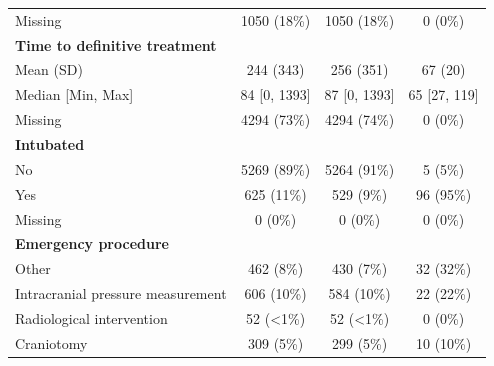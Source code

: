 \documentclass[12pt, a4paper]{article}
\begin{document}
\begin{appendices}
\begin{table}[t!]
{\begin{tabular}{lccc}
                \hspace{3mm}Missing                           & 1050 (18\%)       & 1050 (18\%)       & 0 (0\%)       \\
                \textbf{Time to definitive treatment}         &                   &                   &               \\
                \hspace{3mm}Mean (SD)                         & 244 (343)         & 256 (351)         & 67 (20)       \\
                \hspace{3mm}Median [Min, Max]                 & 84 [0, 1393]      & 87 [0, 1393]      & 65 [27, 119]  \\
                \hspace{3mm}Missing                           & 4294 (73\%)       & 4294 (74\%)       & 0 (0\%)       \\
                \textbf{Intubated}                            &                   &                   &               \\
                \hspace{3mm}No                                & 5269 (89\%)       & 5264 (91\%)       & 5 (5\%)       \\
                \hspace{3mm}Yes                               & 625 (11\%)        & 529 (9\%)         & 96 (95\%)     \\
                \hspace{3mm}Missing                           & 0 (0\%)           & 0 (0\%)           & 0 (0\%)       \\
                \textbf{Emergency procedure}                  &                   &                   &               \\
                \hspace{3mm}Other                             & 462 (8\%)         & 430 (7\%)         & 32 (32\%)     \\
                \hspace{3mm}Intracranial pressure measurement & 606 (10\%)        & 584 (10\%)        & 22 (22\%)     \\
                \hspace{3mm}Radiological intervention         & 52 (\textless1\%) & 52 (\textless1\%) & 0 (0\%)       \\
                \hspace{3mm}Craniotomy                        & 309 (5\%)         & 299 (5\%)         & 10 (10\%)     \\

\end{tabular}}
\end{table}
\end{appendices}
\end{document}
